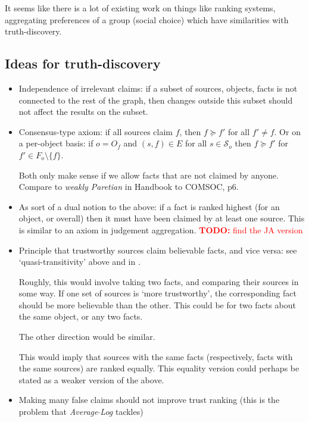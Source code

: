 \documentclass{article}
\theoremstyle{definition} \newtheorem{definition}{Definition}
\theoremstyle{definition} \newtheorem{example}{Example}
\theoremstyle{plain} \newtheorem{axiom}{Axiom}
\theoremstyle{plain} \newtheorem*{remark}{Remark}
\theoremstyle{remark} \newtheorem*{notation}{Notation}
\theoremstyle{plain} \newtheorem{lemma}{Lemma}
\theoremstyle{plain} \newtheorem{proposition}{Proposition}
\newcommand{\todo}[1] {
    \textcolor{red}{
        \textbf{TODO:} #1
    }
}
\renewcommand{\S}{\mathcal{S}}  %
\newcommand{\fge}{\succeq}
\begin{document}
It seems like there is a lot of existing work on things like ranking systems,
aggregating preferences of a group (social choice) which have similarities with
truth-discovery.

\subsection{Ideas for truth-discovery}
\begin{itemize}

\item Independence of irrelevant claims: if a subset of sources, objects, facts
is not connected to the rest of the graph, then changes outside this subset
should not affect the results on the subset.

\item Consensus-type axiom: if all sources claim $f$, then $f \fge f'$ for all
$f' \ne f$. Or on a per-object basis: if $o = O_f$ and $(s, f) \in E$ for all
$s \in \S_o$ then $f \fge f'$ for $f' \in F_o \setminus \{f\}$.

Both only make sense if we allow facts that are not claimed by anyone. Compare
to \emph{weakly Paretian} in Handbook to COMSOC, p6.

\item As sort of a dual notion to the above: if a fact is ranked highest (for
an object, or overall) then it must have been claimed by at least one source.
This is similar to an axiom in judgement aggregation. \todo{find the JA
version}

\item Principle that trustworthy sources claim believable facts, and vice
versa: see `quasi-transitivity' above and in \cite{altman_personalised}.

Roughly, this would involve taking two facts, and comparing their sources in
some way. If one set of sources is `more trustworthy', the corresponding fact
should be more believable than the other. This could be for two facts about the
same object, or any two facts.

The other direction would be similar.

This would imply that sources with the same facts (respectively, facts with the
same sources) are ranked equally. This equality version could perhaps be
stated as a weaker version of the above.

\item Making many false claims should not improve trust ranking (this is the
problem that \emph{Average${\cdot}$Log} tackles)


\end{itemize}
\end{document}
